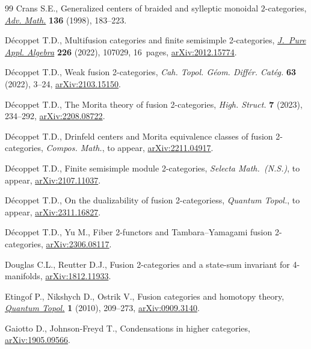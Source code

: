 \documentclass[11pt]{article}
\numberwithin{equation}{section}
\numberwithin{equation}{section}
\begin{document}
\begin{thebibliography}{99}
Crans S.E., Generalized centers of braided and sylleptic monoidal
 {$2$}-categories, \href{https://doi.org/10.1006/aima.1998.1720}{\textit{Adv. Math.}} \textbf{136} (1998), 183--223.

D\'ecoppet T.D., Multifusion categories and finite semisimple 2-categories,
 \href{https://doi.org/10.1016/j.jpaa.2022.107029}{\textit{J.~Pure Appl. Algebra}} \textbf{226} (2022), 107029, 16~pages,
 \href{https://arxiv.org/abs/2012.15774}{arXiv:2012.15774}.

D\'ecoppet T.D., Weak fusion 2-categories, \textit{Cah. Topol. G\'eom.
 Diff\'er. Cat\'eg.} \textbf{63} (2022), 3--24, \href{https://arxiv.org/abs/2103.15150}{arXiv:2103.15150}.

D\'ecoppet T.D., The {M}orita theory of fusion 2-categories, \textit{High.
 Struct.} \textbf{7} (2023), 234--292, \href{https://arxiv.org/abs/2208.08722}{arXiv:2208.08722}.

D\'ecoppet T.D., Drinfeld centers and {M}orita equivalence classes of fusion
 2-categories, \textit{Compos. Math.}, {t}o appear, \href{https://arxiv.org/abs/2211.04917}{arXiv:2211.04917}.

D\'ecoppet T.D., Finite semisimple module 2-categories, \textit{Selecta Math.~(N.S.)}, {t}o appear, \href{https://arxiv.org/abs/2107.11037}{arXiv:2107.11037}.

D\'ecoppet T.D., On the dualizability of fusion 2-categoriess, \textit{Quantum Topol.}, {t}o appear, \href{https://arxiv.org/abs/2311.16827}{arXiv:2311.16827}.

D\'ecoppet T.D., Yu M., Fiber 2-functors and {T}ambara--{Y}amagami fusion
 2-categories, \href{https://arxiv.org/abs/2306.08117}{arXiv:2306.08117}.

Douglas C.L., Reutter D.J., Fusion 2-categories and a state-sum invariant for
 4-manifolds, \href{https://arxiv.org/abs/1812.11933}{arXiv:1812.11933}.

Etingof P., Nikshych D., Ostrik V., Fusion categories and homotopy theory,
 \href{https://doi.org/10.4171/QT/6}{\textit{Quantum Topol.}} \textbf{1} (2010), 209--273, \href{https://arxiv.org/abs/0909.3140}{arXiv:0909.3140}.

Gaiotto D., Johnson-Freyd T., Condensations in higher categories,
 \href{https://arxiv.org/abs/1905.09566}{arXiv:1905.09566}.


\end{thebibliography}
\end{document}
